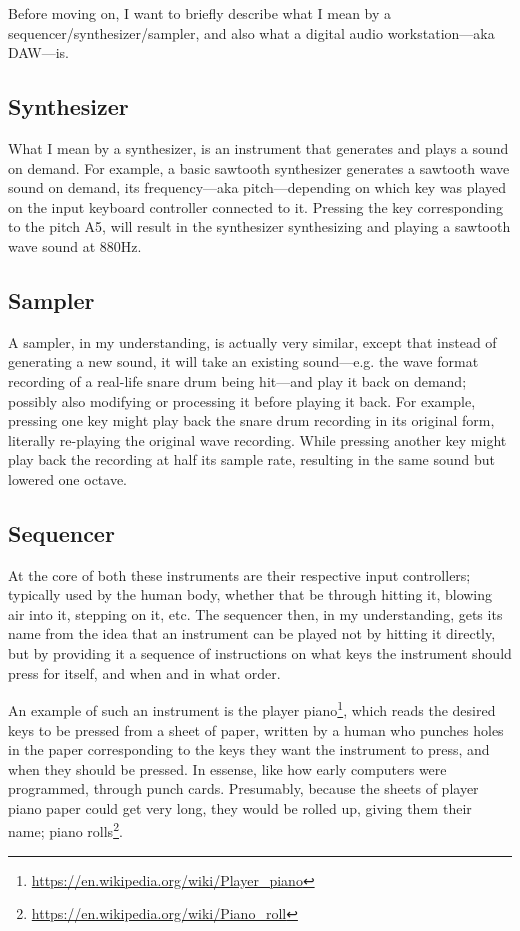 \noindent
Before moving on, I want to briefly describe what I mean by a sequencer/synthesizer/sampler, 
and also what a digital audio workstation---aka DAW---is. 

\subsection{Synthesizer}
\noindent
What I mean by a synthesizer, is an instrument that generates and plays a sound on demand. For 
example, a basic sawtooth synthesizer generates a sawtooth wave sound on demand, its frequency---aka 
pitch---depending on which key was played on the input keyboard controller connected to it. Pressing the 
key corresponding to the pitch A5, will result in the synthesizer synthesizing and playing a sawtooth 
wave sound at 880Hz. 

\subsection{Sampler}
\noindent
A sampler, in my understanding, is actually very similar, except that instead of generating a new sound, 
it will take an existing sound---e.g. the wave format recording of a real-life snare drum being hit---and 
play it back on demand; possibly also modifying or processing it before playing it back. For example, pressing 
one key might play back the snare drum recording in its original form, literally re-playing the original wave 
recording. While pressing another key might play back the recording at half its sample rate, resulting in 
the same sound but lowered one octave.

\subsection{Sequencer}
\noindent
At the core of both these instruments are their respective input controllers; 
typically used by the human body, whether that be through hitting it, blowing air into it, stepping on it, etc.
The sequencer then, in my understanding, gets its name from the idea that an instrument can be played not by 
hitting it directly, but by providing it a sequence of instructions on what keys the instrument should press for 
itself, and when and in what order.

An example of such an instrument is the player piano\footnote{\url{https://en.wikipedia.org/wiki/Player_piano}},
which reads the desired keys to be pressed from a sheet of paper, written by a human who punches holes in the paper 
corresponding to the keys they want the instrument to press, and when they should be pressed. In essense, like how 
early computers were programmed, through punch cards. Presumably, because the sheets of player piano paper could get 
very long, they would be rolled up, giving them their name; piano rolls\footnote{\url{https://en.wikipedia.org/wiki/Piano_roll}}. 

